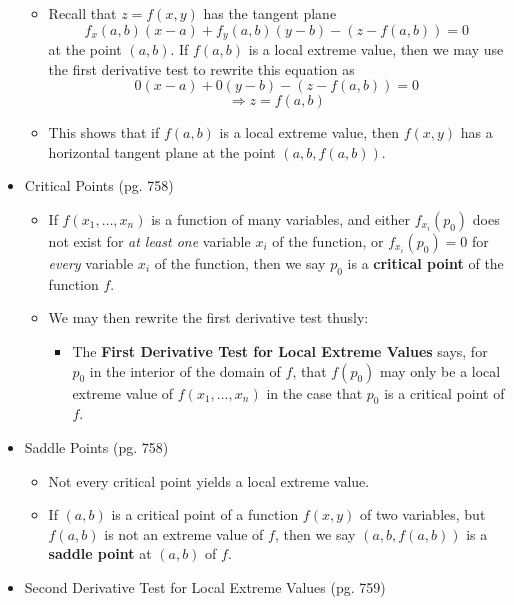 \documentclass[12pt]{article}
\theoremstyle{plain}
\theoremstyle{definition}
\theoremstyle{remark}
\begin{document}
\begin{itemize}
		\begin{itemize}
		\item Recall that $z=f(x,y)$ has the tangent plane \[f_x(a,b)(x-a)+f_y(a,b)(y-b)-(z-f(a,b))=0\] at the point $(a,b)$. If $f(a,b)$ is a local extreme value, then we may use the first derivative test to rewrite this equation as \[0(x-a)+0(y-b)-(z-f(a,b))=0\] \[\Rightarrow z=f(a,b)\]
		\item This shows that if $f(a,b)$ is a local extreme value, then $f(x,y)$ has a horizontal tangent plane at the point $(a,b,f(a,b))$.
		\end{itemize}
		
	\item Critical Points (pg. 758)
	
		\begin{itemize}
		\item If $f(x_1,\dots,x_n)$ is a function of many variables, and either $f_{x_i}(p_0)$ does not exist for \textit{at least one} variable $x_i$ of the function, or $f_{x_i}(p_0)=0$ for \textit{every} variable $x_i$ of the function, then we say $p_0$ is a \textbf{critical point} of the function $f$.
		\item We may then rewrite the first derivative test thusly:
			\begin{itemize}
			\item The \textbf{First Derivative Test for Local Extreme Values} says, for $p_0$ in the interior of the domain of $f$, that $f(p_0)$ may only be a local extreme value of $f(x_1,\dots,x_n)$ in the case that $p_0$ is a critical point of $f$.
			\end{itemize}
		\end{itemize}
		
	\item Saddle Points (pg. 758)
	
		\begin{itemize}
		\item Not every critical point yields a local extreme value.
		\item If $(a,b)$ is a critical point of a function $f(x,y)$ of two variables, but $f(a,b)$ is not an extreme value of $f$, then we say $(a,b,f(a,b))$ is a \textbf{saddle point} at $(a,b)$ of $f$.
		\end{itemize}
		
	\item Second Derivative Test for Local Extreme Values (pg. 759)
	

\end{itemize}
\end{document}
